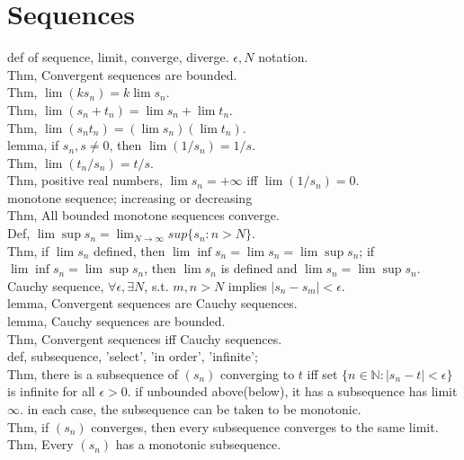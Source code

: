 \documentclass[paper=a4, fontsize=11pt]{scrartcl} %
\numberwithin{equation}{section} %
\numberwithin{figure}{section} %
\numberwithin{table}{section} %
\begin{document}
\section{Sequences}
def of sequence, limit, converge, diverge. $\epsilon, N$ notation.\\
Thm, Convergent sequences are bounded.\\
Thm, $\lim(ks_n) = k\lim s_n$.\\
Thm, $\lim(s_n+t_n)=\lim s_n+ \lim t_n$.\\
Thm, $\lim(s_nt_n)=(\lim s_n) (\lim t_n)$.\\
lemma, if $s_n, s\neq 0$, then $\lim (1/s_n) = 1/s$.\\
Thm, $\lim(t_n/s_n)=t/s$.\\
Thm, positive real numbers, $\lim s_n=+\infty$ iff $\lim(1/s_n) =0$.\\
monotone sequence; increasing or decreasing\\
Thm, All bounded monotone sequences converge.\\
Def, $\lim \sup s_n = \lim_{N\rightarrow\infty} sup\{s_n:n>N\}$.\\
Thm, if $\lim s_n$ defined, then $\lim \inf s_n=\lim s_n =\lim \sup s_n$; if $\lim \inf s_n=\lim \sup s_n$, then $\lim s_n$ is defined and $\lim s_n =\lim \sup s_n$.\\
Cauchy sequence, $\forall\epsilon, \exists N$, s.t. $m,n>N$ implies $|s_n-s_m|<\epsilon$.\\
lemma, Convergent sequences are Cauchy sequences.\\
lemma, Cauchy sequences are bounded.\\
Thm, Convergent sequences iff Cauchy sequences.\\
def, subsequence, 'select', 'in order', 'infinite';\\
Thm, there is a subsequence of $(s_n)$ converging to $t$ iff set $\{n\in\mathbb{N}: |s_n-t|<\epsilon\}$ is infinite for all $\epsilon>0$. if unbounded above(below), it has a subsequence has limit $\infty$. in each case, the subsequence can be taken to be monotonic.\\
Thm, if $(s_n)$ converges, then every subsequence converges to the same limit.\\
Thm, Every $(s_n)$ has a monotonic subsequence.\\
\end{document}
